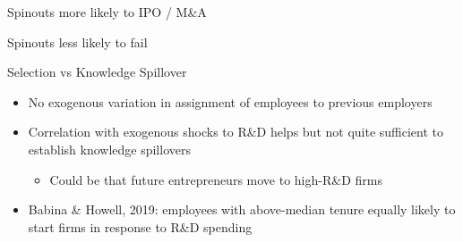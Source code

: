 \documentclass[english,usenames,dvipsnames]{beamer}
\begin{document}
\begin{frame}{Spinouts more likely to IPO / M\&A}
\begin{table}
\tiny
\centering

\caption{\footnotesize The regresssions above compare the \textbf{\alert{M\&A and IPO hazard rate}} in WSO4 spinouts, non-WSO4 spinouts and non-spinouts. The first regression uses no controls. The following three regressions in addition control for year effects, age effects, and / or cohort effects, in each case allowing the relevant effect to differ by State-NAICS4 combination. Standard errors are multi-way clustered at the state, NAICS4 and year levels.}
\end{table}
\end{frame}

\begin{frame}{Spinouts less likely to fail}
\begin{table}
\tiny
\centering

\caption{\footnotesize The regresssions above compare the \textbf{\alert{failure rate}} in WSO4 spinouts, non-WSO4 spinouts and non-spinouts. The first regression uses no controls. The following three regressions in addition control for year effects, age effects, and / or cohort effects, in each case allowing the relevant effect to differ by State-NAICS4 combination. Standard errors are multi-way clustered at the state, NAICS4 and year levels.}
\end{table}
\end{frame}

\begin{frame}{Selection vs Knowledge Spillover}
\begin{itemize}
	\item No exogenous variation in assignment of employees to previous employers 
	\item Correlation with exogenous shocks to R\&D helps but not quite sufficient to establish knowledge spillovers
	\begin{itemize}
		\item Could be that future entrepreneurs move to high-R\&D firms
	\end{itemize}
	\item Babina \& Howell, 2019: employees with above-median tenure equally likely to start firms in response to R\&D spending
\end{itemize}
\end{frame}
\end{document}
